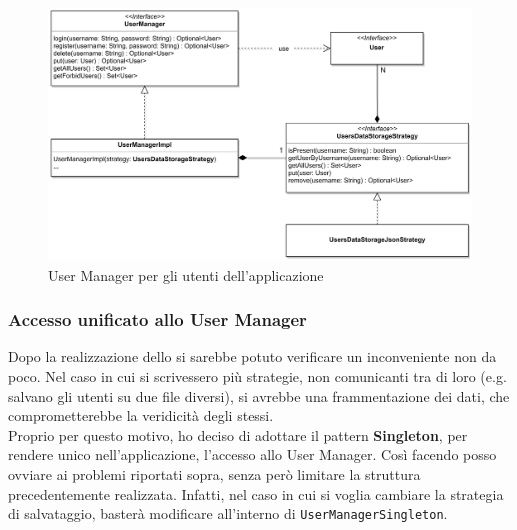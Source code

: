 \documentclass[a4paper,12pt]{report}
\begin{document}
\begin{figure}[ht]
    \begin{center}
        \centering
        \includegraphics[width=\textwidth]{img/Manuel/shadow/UserManager.png}
    \end{center}
    \caption{User Manager per gli utenti dell'applicazione}
    \label{img:UserManager}
\end{figure}
%

\subsubsection*{Accesso unificato allo User Manager}

Dopo la realizzazione dello \texttt{} si sarebbe potuto verificare un inconveniente non da poco. Nel caso in cui si scrivessero più strategie, non comunicanti tra di loro (e.g. salvano gli utenti su due file diversi), si avrebbe una frammentazione dei dati, che comprometterebbe la veridicità degli stessi. 
\\
Proprio per questo motivo, ho deciso di adottare il pattern \textbf{Singleton}, per rendere unico nell'applicazione, l'accesso allo User Manager. Così facendo posso ovviare ai problemi riportati sopra, senza però limitare la struttura precedentemente realizzata. Infatti, nel caso in cui si voglia cambiare la strategia di salvataggio, basterà modificare all'interno di \texttt{UserManagerSingleton}.
\end{document}

